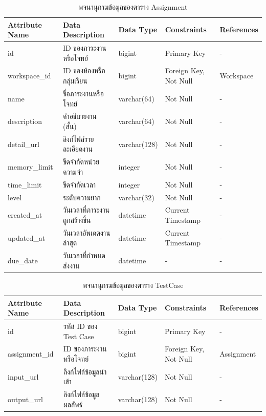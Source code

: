 \documentclass[12pt,oneside,openright,a4paper]{cpe-thai-project}
\begin{document}
    \begin{table}[!h]
        \centering
        \caption{พจนานุกรมข้อมูลของตาราง Assignment}\label{tbl:data-dict-assignment}
        \begin{tabular}{p{2cm}|p{4cm}p{2cm}p{3cm}p{2cm}} \hline\hline
            Attribute Name & Data Description & Data Type & Constraints & References \\ \hline\hline
            id & ID ของภาระงานหรือโจทย์ & bigint & Primary Key & - \\
            workspace\_id & ID ของห้องหรือกลุ่มเรียน & bigint & Foreign Key, Not Null & Workspace \\
            name & ชื่อภาระงานหรือโจทย์ & varchar(64) & Not Null & - \\
            description & คำอธิบายงาน (สั้น) & varchar(64) & Not Null & - \\
            detail\_url & ลิงก์ไฟล์รายละเอียดงาน & varchar(128) & Not Null & - \\
            memory\_limit & ขีดจำกัดหน่วยความจำ & integer & Not Null & - \\
            time\_limit & ขีดจำกัดเวลา & integer & Not Null & - \\
            level & ระดับความยาก & varchar(32) & Not Null & - \\
            created\_at & วันเวลาที่ภาระงานถูกสร้างขึ้น & datetime & Current Timestamp & - \\
            updated\_at & วันเวลาอัพเดตงานล่าสุด & datetime & Current Timestamp & - \\ 
            due\_date & วันเวลาที่กำหนดส่งงาน & datetime & - & - \\ \hline\hline
        \end{tabular}   
    \end{table}

    \begin{table}[!h]
        \centering
        \caption{พจนานุกรมข้อมูลของตาราง TestCase}\label{tbl:data-dict-testcase}
        \begin{tabular}{p{2cm}|p{4cm}p{2cm}p{3cm}p{2cm}} \hline\hline
            Attribute Name & Data Description & Data Type & Constraints & References \\ \hline\hline
            id & รหัส ID ของ Test Case & bigint & Primary Key & - \\
            assignment\_id & ID ของภาระงานหรือโจทย์ & bigint & Foreign Key, Not Null & Assignment \\
            input\_url & ลิงก์ไฟล์ข้อมูลนำเข้า & varchar(128) & Not Null & - \\
            output\_url & ลิงก์ไฟล์ข้อมูลผลลัพธ์ & varchar(128) & Not Null & - \\ \hline\hline
        \end{tabular}   
    \end{table}
\end{document}

